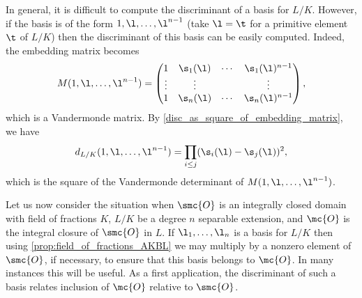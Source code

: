 \documentclass[12pt]{article}
\begin{document}
      In general, it is difficult to compute the discriminant of a basis for \(L/K\). However, if the basis is of the form \(1,\l,\ldots,\l^{n-1}\) (take \(\l = \t\) for a primitive element \(\t\) of \(L/K\)) then the discriminant of this basis can be easily computed. Indeed, the embedding matrix becomes
      \[
        M(1,\l,\ldots,\l^{n-1}) = \begin{pmatrix} 1 & \s_{1}(\l) & \cdots & \s_{1}(\l)^{n-1} \\ \vdots & \vdots & & \vdots \\ 1 & \s_{n}(\l) & \cdots & \s_{n}(\l)^{n-1} \end{pmatrix},
      \]
      which is a Vandermonde matrix. By \cref{disc_as_square_of_embedding_matrix}, we have
      \begin{equation}\label{equ:Vandermonde_determinant_for_discriminant}
        d_{L/K}(1,\l,\ldots,\l^{n-1}) = \prod_{i \le j}(\s_{i}(\l)-\s_{j}(\l))^{2},
      \end{equation}
      which is the square of the Vandermonde determinant of \(M(1,\l,\ldots,\l^{n-1})\).

      Let us now consider the situation when \(\smc{O}\) is an integrally closed domain with field of fractions \(K\), \(L/K\) be a degree \(n\) separable extension, and \(\mc{O}\) is the integral closure of \(\smc{O}\) in \(L\). If \(\l_{1},\ldots,\l_{n}\) is a basis for \(L/K\) then using \cref{prop:field_of_fractions_AKBL} we may multiply by a nonzero element of \(\smc{O}\), if necessary, to ensure that this basis belongs to \(\mc{O}\). In many instances this will be useful. As a first application, the discriminant of such a basis relates inclusion of \(\mc{O}\) relative to \(\smc{O}\).
\end{document}
